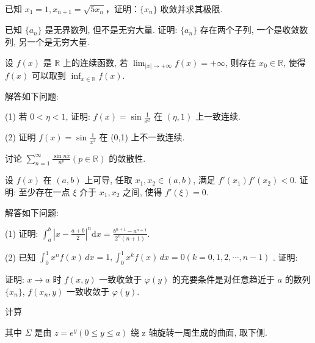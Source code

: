 已知 $x_{1} = 1, x_{n + 1} = \sqrt{5x_{n}}$，证明：$\{x_{n}\}$ 收敛并求其极限.\par
已知 $\{a_{n}\}$ 是无界数列, 但不是无穷大量. 证明: $\{a_{n}\}$ 存在两个子列, 一个是收敛数列, 另一个是无穷大量.\par
设 $f(x)$ 是 $\mathbb{R}$ 上的连续函数, 若 $\lim_{|x|\to +\infty}f(x) = +\infty$, 则存在 $x_0 \in \mathbb{R}$, 使得 $f(x)$ 可以取到 $\inf_{x \in \mathbb{R}} f(x)$.\par
解答如下问题:\par
(1) 若 $0 < \eta < 1$, 证明: $f(x) = \sin \frac{1}{x^2}$ 在 $(\eta, 1)$ 上一致连续.\par
(2) 证明 $f(x) = \sin \frac{1}{x^2}$ 在 (0,1) 上不一致连续.\par
讨论 $\sum_{n=1}^{\infty} \frac{\sin nx}{n^p} (p \in \mathbb{R})$ 的敛散性.\par
设 $f(x)$ 在 $(a, b)$ 上可导, 任取 $x_1, x_2 \in (a, b)$, 满足 $f'(x_1)f'(x_2) < 0$. 证明: 至少存在一点 $\xi$ 介于 $x_1, x_2$ 之间, 使得 $f'(\xi) = 0$.\par
解答如下问题:\par
(1) 证明: $\int_{a}^{b}\left|x - \frac{a + b}{2}\right|^{n}\mathrm{d}x = \frac{b^{n + 1} - a^{n + 1}}{2^n(n + 1)}.$\par
\par{}
(2) 已知  $\int_{0}^{1} x^{n} f(x) \, dx = 1, \int_{0}^{1} x^{k} f(x) \, dx = 0 (k = 0, 1, 2, \cdots, n - 1)$ . 证明:\par
\nopagebreak[4]
证明: $x \to a$ 时 $f(x, y)$ 一致收敛于 $\varphi(y)$ 的充要条件是对任意趋近于 $a$ 的数列 $\{x_n\}$, $f(x_n, y)$ 一致收敛于 $\varphi(y)$.\par
\par{}
计算\par
\nopagebreak[4]
其中  $\Sigma$  是由  $z = e^{y} (0 \leq y \leq a)$  绕 z 轴旋转一周生成的曲面, 取下侧.\par
